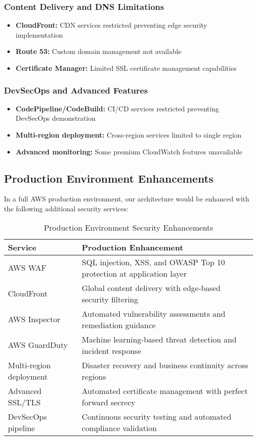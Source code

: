 \documentclass[12pt]{article}
\begin{document}
\subsubsection{Content Delivery and DNS Limitations}
\begin{itemize}
\item \textbf{CloudFront:} CDN services restricted preventing edge security implementation
\item \textbf{Route 53:} Custom domain management not available
\item \textbf{Certificate Manager:} Limited SSL certificate management capabilities
\end{itemize}

\subsubsection{DevSecOps and Advanced Features}
\begin{itemize}
\item \textbf{CodePipeline/CodeBuild:} CI/CD services restricted preventing DevSecOps demonstration
\item \textbf{Multi-region deployment:} Cross-region services limited to single region
\item \textbf{Advanced monitoring:} Some premium CloudWatch features unavailable
\end{itemize}

\subsection{Production Environment Enhancements}

In a full AWS production environment, our architecture would be enhanced with the following additional security services:

\begin{table}[H]
\centering
\begin{tabular}{|p{4cm}|p{8cm}|}
\hline
\textbf{Service} & \textbf{Production Enhancement} \\
\hline
AWS WAF & SQL injection, XSS, and OWASP Top 10 protection at application layer \\
\hline
CloudFront & Global content delivery with edge-based security filtering \\
\hline
AWS Inspector & Automated vulnerability assessments and remediation guidance \\
\hline
AWS GuardDuty & Machine learning-based threat detection and incident response \\
\hline
Multi-region deployment & Disaster recovery and business continuity across regions \\
\hline
Advanced SSL/TLS & Automated certificate management with perfect forward secrecy \\
\hline
DevSecOps pipeline & Continuous security testing and automated compliance validation \\
\hline
\end{tabular}
\caption{Production Environment Security Enhancements}
\label{tab:production_enhancements}
\end{table}
\end{document}
